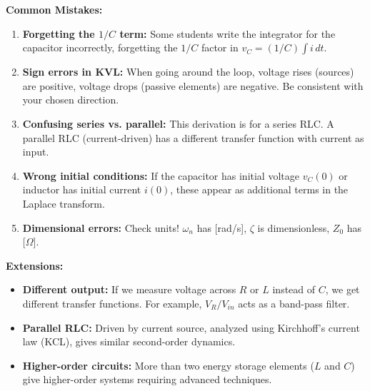 \begin{example}
\textbf{Common Mistakes:}

\begin{enumerate}
    \item \textbf{Forgetting the $1/C$ term:} Some students write the integrator for the capacitor incorrectly, forgetting the $1/C$ factor in $v_C = (1/C)\int i\,dt$.

    \item \textbf{Sign errors in KVL:} When going around the loop, voltage rises (sources) are positive, voltage drops (passive elements) are negative. Be consistent with your chosen direction.

    \item \textbf{Confusing series vs. parallel:} This derivation is for a series RLC. A parallel RLC (current-driven) has a different transfer function with current as input.

    \item \textbf{Wrong initial conditions:} If the capacitor has initial voltage $v_C(0)$ or inductor has initial current $i(0)$, these appear as additional terms in the Laplace transform.

    \item \textbf{Dimensional errors:} Check units! $\omega_n$ has [rad/s], $\zeta$ is dimensionless, $Z_0$ has [$\Omega$].
\end{enumerate}

\textbf{Extensions:}

\begin{itemize}
    \item \textbf{Different output:} If we measure voltage across $R$ or $L$ instead of $C$, we get different transfer functions. For example, $V_R/V_{in}$ acts as a band-pass filter.

    \item \textbf{Parallel RLC:} Driven by current source, analyzed using Kirchhoff's current law (KCL), gives similar second-order dynamics.

    \item \textbf{Higher-order circuits:} More than two energy storage elements ($L$ and $C$) give higher-order systems requiring advanced techniques.
\end{itemize}

\end{example}

